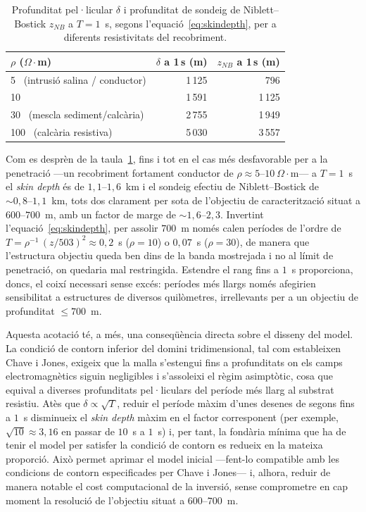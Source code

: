 \begin{table}[htbp]
    \centering
    \caption{Profunditat pel·licular $\delta$ i profunditat de sondeig de
    Niblett--Bostick $z_{NB}$ a $T = 1$~s, segons l'equació~\eqref{eq:skindepth},
    per a diferents resistivitats del recobriment.}
    \label{tab:skindepth}
    \begin{tabular}{l r r}
        \toprule
        $\rho$ ($\Omega\!\cdot\!$m) & $\delta$ a 1\,s (m) & $z_{NB}$ a 1\,s (m) \\
        \midrule
        5 \ (intrusió salina / conductor) & 1\,125 & 796 \\
        10                                & 1\,591 & 1\,125 \\
        30 \ (mescla sediment/calcària)   & 2\,755 & 1\,949 \\
        100 \ (calcària resistiva)        & 5\,030 & 3\,557 \\
        \bottomrule
    \end{tabular}
\end{table}

Com es desprèn de la taula~\ref{tab:skindepth}, fins i tot en el cas més desfavorable
per a la penetració —un recobriment fortament conductor de
$\rho \approx 5\text{–}10\ \Omega\!\cdot\!$m— a $T = 1$~s el \emph{skin depth} és de
$1{,}1\text{–}1{,}6$~km i el sondeig efectiu de Niblett--Bostick de
$\sim 0{,}8\text{–}1{,}1$~km, tots dos clarament per sota de l'objectiu de
caracterització situat a $600\text{–}700$~m, amb un factor de marge de
$\sim 1{,}6\text{–}2{,}3$. Invertint l'equació~\eqref{eq:skindepth}, per assolir
$700$~m només calen períodes de l'ordre de
$T = \rho^{-1}\,(z/503)^{2} \approx 0{,}2$~s ($\rho = 10$) o $0{,}07$~s
($\rho = 30$), de manera que l'estructura objectiu queda ben dins de la banda
mostrejada i no al límit de penetració, on quedaria mal restringida. Estendre el
rang fins a $1$~s proporciona, doncs, el coixí necessari sense excés: períodes més
llargs només afegirien sensibilitat a estructures de diversos quilòmetres,
irrellevants per a un objectiu de profunditat $\leq 700$~m.

Aquesta acotació té, a més, una conseqüència directa sobre el disseny del model. La
condició de contorn inferior del domini tridimensional, tal com estableixen
Chave i Jones, exigeix que la malla s'estengui fins a profunditats on els camps
electromagnètics siguin negligibles i s'assoleixi el règim asimptòtic, cosa que
equival a diverses profunditats pel·liculars del període més llarg al substrat
resistiu. Atès que $\delta \propto \sqrt{T}$, reduir el període màxim d'unes desenes
de segons fins a $1$~s disminueix el \emph{skin depth} màxim en el factor
corresponent (per exemple, $\sqrt{10} \approx 3{,}16$ en passar de $10$~s a $1$~s) i,
per tant, la fondària mínima que ha de tenir el model per satisfer la condició de
contorn es redueix en la mateixa proporció. Això permet aprimar el model inicial
—fent-lo compatible amb les condicions de contorn especificades per Chave i Jones—
i, alhora, reduir de manera notable el cost computacional de la inversió, sense
comprometre en cap moment la resolució de l'objectiu situat a $600\text{–}700$~m.

